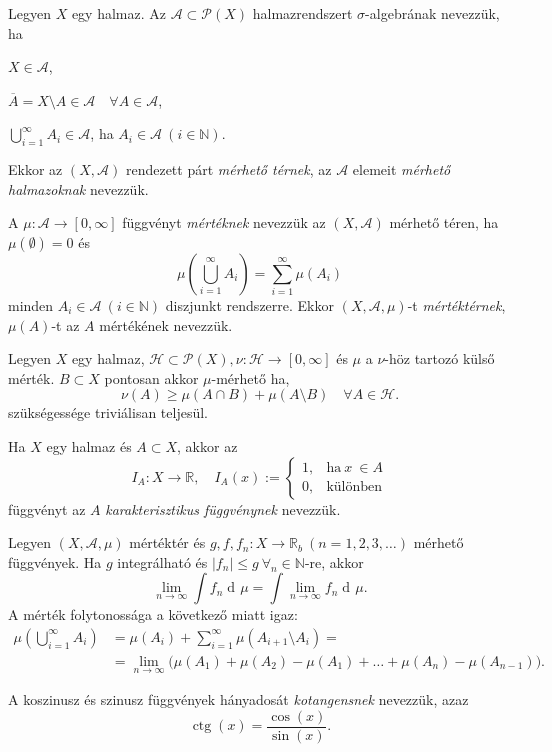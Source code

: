 \documentclass[a4paper,12pt]{article}
\DeclareMathOperator{\diff}{d\!}
\DeclareMathOperator{\ctg}{ctg}
\begin{document}
	Legyen $X$ egy halmaz. Az $\mathcal{A} \subset\mathcal{P}(X)$ halmazrendszert $\sigma$-algebrának nevezzük, ha
	\begin{compactenum}
		\item $X \in\mathcal{A}$,
		\item $\overline{A}=X\setminus A \in\mathcal{A} \quad\forall A\in\mathcal{A}$,
		\item $\bigcup_{i=1}^{\infty}A_{i} \in\mathcal{A}$, ha $A_{i} \in\mathcal{A}\ (i \in \mathbb{N})$.
	\end{compactenum}
	Ekkor az $(X, \mathcal{A})$ rendezett párt \emph{mérhető térnek}, az $\mathcal{A}$ elemeit \emph{mérhető halmazoknak} nevezzük.
	
	A $\mu\colon \mathcal{A} \rightarrow [0,\infty]$ függvényt \emph{mértéknek} nevezzük az $(X,\mathcal{A})$
	mérhető téren, ha $\mu(\emptyset) = 0$ és
	\begin{equation*}
		\mu\left(\bigcup_{i=1}^{\infty}A_{i}\right)=\sum_{i=1}^{\infty}\mu (A_{i})
	\end{equation*}
	minden $A_{i} \in\mathcal{A}\ (i\in\mathbb{N})$ diszjunkt rendszerre. Ekkor $(X,\mathcal{A},\mu)$-t \emph{mértéktérnek}, $\mu(A)$-t az $A$ mértékének nevezzük.
	
	Legyen $X$ egy halmaz, $\mathcal{H} \subset \mathcal{P}(X), \nu\colon \mathcal{H}\rightarrow [0,\infty]$ és
	$\mu$ a $\nu$-höz tartozó külső mérték. $B \subset X$ pontosan akkor $\mu$-mérhető ha,
	\begin{equation}\label{eq-add}
		\nu(A) \geq \mu (A\cap B) + \mu(A\setminus B) \quad \forall A\in\mathcal{H}.
	\end{equation}
	\Az{\eqref{eq-add}} szükségessége triviálisan teljesül.
	
	Ha $X$ egy halmaz és $A \subset X$, akkor az
	\begin{equation*}
		I_{A}\colon X \rightarrow \mathbb{R},\quad I_{A}(x):=
		\begin{cases}
			1,& \text{ha}\ x\ \in A \\
			0,& \text{különben}
		\end{cases}
	\end{equation*}
	függvényt  az $A$ \emph{karakterisztikus függvénynek} nevezzük.
	
	Legyen $(X, \mathcal{A}, \mu)$ mértéktér és $g,f,f_{n}\colon X \rightarrow \mathbb{R}_b\ (n=1,  2, 3,\dots)$ mérhető függvények. Ha $g$ integrálható és $|f_{n}| \leq g\ \forall_{n} \in \mathbb{N}$-re, akkor
	\begin{equation*}
		\lim_{n\rightarrow\infty}\int f_{n} \diff\mu = \int\lim_{n\rightarrow\infty}f_{n}\diff\mu.
	\end{equation*}
	A mérték folytonossága a következő miatt igaz:
	\begin{align*}
		\mu\left(\bigcup_{i=1}^{\infty}A_{i}\right)&=\mu (A_{i}) + \sum_{i=1}^{\infty}\mu (A_{i+1} \setminus A_{i}) = \\
		&= \lim_{n\to\infty} \bigl(\mu(A_{1})+\mu(A_{2}) - \mu(A_{1}) + \dots + \mu(A_{n}) - \mu(A_{n-1})\bigr).
	\end{align*}

	A koszinusz és szinusz függvények hányadosát \emph{kotangensnek} nevezzük,
	azaz
	\begin{equation*}
		\ctg(x)=\frac{\cos(x)}{\sin(x)}.
	\end{equation*}
\end{document}
